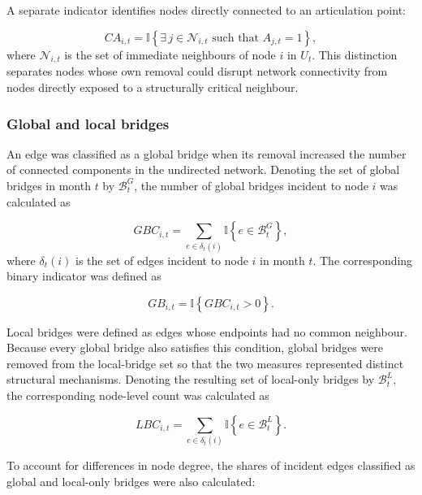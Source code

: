 \documentclass[pdftex,12pt,openright,a4paper,oneside]{book}
\begin{document}
A separate indicator identifies nodes directly connected to an articulation point:

\begin{equation}
CA_{i,t}
=
\mathbb{I}
\left\{
\exists\,j\in\mathcal{N}_{i,t}
\text{ such that } A_{j,t}=1
\right\},
\label{eq:connected_articulation}
\end{equation}
where \(\mathcal{N}_{i,t}\) is the set of immediate neighbours of node \(i\) in \(U_t\). This distinction separates nodes whose own removal could disrupt network connectivity from nodes directly exposed to a structurally critical neighbour.

\subsubsection{Global and local bridges}
An edge was classified as a global bridge when its removal increased the number of connected components in the undirected network. Denoting the set of global bridges in month \(t\) by \(\mathcal{B}^{G}_t\), the number of global bridges incident to node \(i\) was calculated as

\begin{equation}
GBC_{i,t}
=
\sum_{e\in\delta_t(i)}
\mathbb{I}
\left\{
e\in\mathcal{B}^{G}_t
\right\},
\label{eq:global_bridge_count}
\end{equation}
where \(\delta_t(i)\) is the set of edges incident to node \(i\) in month \(t\). The corresponding binary indicator was defined as

\begin{equation}
GB_{i,t}
=
\mathbb{I}
\left\{
GBC_{i,t}>0
\right\}.
\label{eq:global_bridge_indicator}
\end{equation}

Local bridges were defined as edges whose endpoints had no common neighbour. Because every global bridge also satisfies this condition, global bridges were removed from the local-bridge set so that the two measures represented distinct structural mechanisms. Denoting the resulting set of local-only bridges by \(\mathcal{B}^{L}_t\), the corresponding node-level count was calculated as

\begin{equation}
LBC_{i,t}
=
\sum_{e\in\delta_t(i)}
\mathbb{I}
\left\{
e\in\mathcal{B}^{L}_t
\right\}.
\label{eq:local_bridge_count}
\end{equation}

To account for differences in node degree, the shares of incident edges classified as global and local-only bridges were also calculated:
\end{document}
